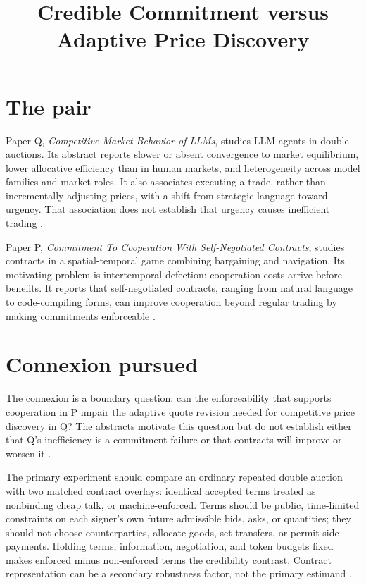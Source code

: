 \documentclass{article}
\title{Credible Commitment versus Adaptive Price Discovery}
\begin{document}
\maketitle

\section{The pair}

Paper Q, \emph{Competitive Market Behavior of LLMs}, studies LLM agents in double auctions.  Its abstract reports slower or absent convergence to market equilibrium, lower allocative efficiency than in human markets, and heterogeneity across model families and market roles.  It also associates executing a trade, rather than incrementally adjusting prices, with a shift from strategic language toward urgency.  That association does not establish that urgency causes inefficient trading .

Paper P, \emph{Commitment To Cooperation With Self-Negotiated Contracts}, studies contracts in a spatial-temporal game combining bargaining and navigation.  Its motivating problem is intertemporal defection: cooperation costs arrive before benefits.  It reports that self-negotiated contracts, ranging from natural language to code-compiling forms, can improve cooperation beyond regular trading by making commitments enforceable .

\section{Connexion pursued}

The connexion is a boundary question: can the enforceability that supports cooperation in P impair the adaptive quote revision needed for competitive price discovery in Q?  The abstracts motivate this question but do not establish either that Q's inefficiency is a commitment failure or that contracts will improve or worsen it .

The primary experiment should compare an ordinary repeated double auction with two matched contract overlays: identical accepted terms treated as nonbinding cheap talk, or machine-enforced.  Terms should be public, time-limited constraints on each signer's own future admissible bids, asks, or quantities; they should not choose counterparties, allocate goods, set transfers, or permit side payments.  Holding terms, information, negotiation, and token budgets fixed makes enforced minus non-enforced terms the credibility contrast.  Contract representation can be a secondary robustness factor, not the primary estimand .
\end{document}
